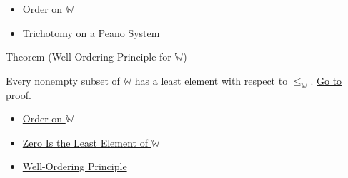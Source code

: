 \begin{dependencies}
\begin{itemize}
  \item \hyperref[def:order-on-w]{Order on $\mathbb{W}$}
  \item \hyperref[thm:trichotomy-on-peano-system]{Trichotomy on a Peano System}
\end{itemize}
\end{dependencies}

\begin{theorembox}{Theorem (Well-Ordering Principle for \texorpdfstring{$\mathbb{W}$}{W})}
\begin{theorem}
\label{thm:well-ordering-principle-for-w}
Every nonempty subset of $\mathbb{W}$ has a least element with respect to
$\leq_{\mathbb{W}}$.
\hyperref[prf:well-ordering-principle-for-w]{Go to proof.}
\end{theorem}
\end{theorembox}

\begin{dependencies}
\begin{itemize}
  \item \hyperref[def:order-on-w]{Order on $\mathbb{W}$}
  \item \hyperref[thm:zero-least-element-of-w]{Zero Is the Least Element of $\mathbb{W}$}
  \item \hyperref[thm:well-ordering-principle]{Well-Ordering Principle}
\end{itemize}
\end{dependencies}
